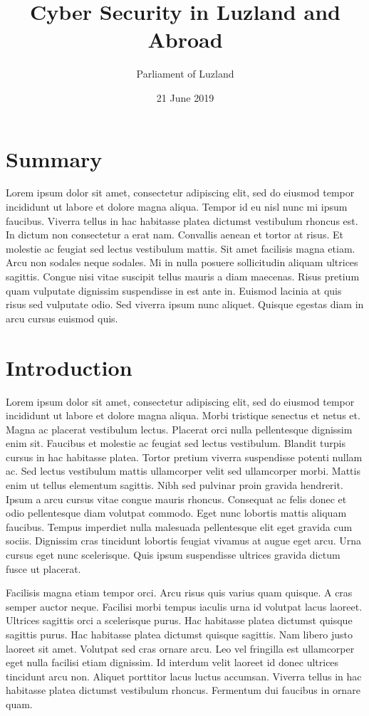 \documentclass[12pt, oneside, a4paper]{article}
\title{Cyber Security in Luzland and Abroad}
\author{Parliament of Luzland}
\date{21 June 2019}
\begin{document}
\maketitle 

\section*{Summary}
\renewcommand\baselinestretch{1}\selectfont
\noindent Lorem ipsum dolor sit amet, consectetur adipiscing elit, sed do eiusmod tempor incididunt ut labore et dolore magna aliqua. Tempor id eu nisl nunc mi ipsum faucibus. Viverra tellus in hac habitasse platea dictumst vestibulum rhoncus est. In dictum non consectetur a erat nam. Convallis aenean et tortor at risus. Et molestie ac feugiat sed lectus vestibulum mattis. Sit amet facilisis magna etiam. Arcu non sodales neque sodales. Mi in nulla posuere sollicitudin aliquam ultrices sagittis. Congue nisi vitae suscipit tellus mauris a diam maecenas. Risus pretium quam vulputate dignissim suspendisse in est ante in. Euismod lacinia at quis risus sed vulputate odio. Sed viverra ipsum nunc aliquet. Quisque egestas diam in arcu cursus euismod quis. 

\clearpage
\section*{Introduction}
Lorem ipsum dolor sit amet, consectetur adipiscing elit, sed do eiusmod tempor incididunt ut labore et dolore magna aliqua. Morbi tristique senectus et netus et. Magna ac placerat vestibulum lectus. Placerat orci nulla pellentesque dignissim enim sit. Faucibus et molestie ac feugiat sed lectus vestibulum. Blandit turpis cursus in hac habitasse platea. Tortor pretium viverra suspendisse potenti nullam ac. Sed lectus vestibulum mattis ullamcorper velit sed ullamcorper morbi. Mattis enim ut tellus elementum sagittis. Nibh sed pulvinar proin gravida hendrerit. Ipsum a arcu cursus vitae congue mauris rhoncus. Consequat ac felis donec et odio pellentesque diam volutpat commodo. Eget nunc lobortis mattis aliquam faucibus. Tempus imperdiet nulla malesuada pellentesque elit eget gravida cum sociis. Dignissim cras tincidunt lobortis feugiat vivamus at augue eget arcu. Urna cursus eget nunc scelerisque. Quis ipsum suspendisse ultrices gravida dictum fusce ut placerat.

Facilisis magna etiam tempor orci. Arcu risus quis varius quam quisque. A cras semper auctor neque. Facilisi morbi tempus iaculis urna id volutpat lacus laoreet. Ultrices sagittis orci a scelerisque purus. Hac habitasse platea dictumst quisque sagittis purus. Hac habitasse platea dictumst quisque sagittis. Nam libero justo laoreet sit amet. Volutpat sed cras ornare arcu. Leo vel fringilla est ullamcorper eget nulla facilisi etiam dignissim. Id interdum velit laoreet id donec ultrices tincidunt arcu non. Aliquet porttitor lacus luctus accumsan. Viverra tellus in hac habitasse platea dictumst vestibulum rhoncus. Fermentum dui faucibus in ornare quam.
\end{document}
